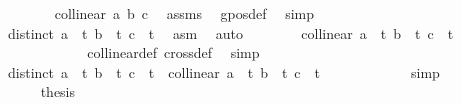 \begin{isabellebody}
\ \ \ \ \ \ \isamarkupfalse%
\ {}{\isacharcolon}{\kern0pt}{\isachardoublequoteopen}{\isasymnot}collinear{}\ a\ b\ c{\isachardoublequoteclose}\ \isamarkupfalse%
\ assms\ \isamarkupfalse%
\ gpos{\isacharunderscore}{\kern0pt}def\ \isamarkupfalse%
\ simp\isanewline
\ \ \ \ \ \ \isamarkupfalse%
\ {}{\isacharcolon}{\kern0pt}{\isachardoublequoteopen}distinct\ {\isacharbrackleft}{\kern0pt}a\ {\isacharplus}{\kern0pt}\ t{\isacharcomma}{\kern0pt}\ b\ {\isacharplus}{\kern0pt}\ t{\isacharcomma}{\kern0pt}\ c\ {\isacharplus}{\kern0pt}\ t{\isacharbrackright}{\kern0pt}{\isachardoublequoteclose}\ \isamarkupfalse%
\ asm{\isacharparenleft}{\kern0pt}{}{\isacharparenright}{\kern0pt}\ \isamarkupfalse%
\ auto\isanewline
\ \ \ \ \ \ \isamarkupfalse%
\ {\isachardoublequoteopen}{\isasymnot}collinear{}\ {\isacharparenleft}{\kern0pt}a\ {\isacharplus}{\kern0pt}\ t{\isacharparenright}{\kern0pt}\ {\isacharparenleft}{\kern0pt}b\ {\isacharplus}{\kern0pt}\ t{\isacharparenright}{\kern0pt}\ {\isacharparenleft}{\kern0pt}c\ {\isacharplus}{\kern0pt}\ t{\isacharparenright}{\kern0pt}{\isachardoublequoteclose}\ \isanewline
\ \ \ \ \ \ \ \ \isamarkupfalse%
\ {}\ \isamarkupfalse%
\ collinear{}{\isacharunderscore}{\kern0pt}def\ cross{}{\isacharunderscore}{\kern0pt}def\ \isamarkupfalse%
\ simp\isanewline
\ \ \ \ \ \ \isamarkupfalse%
\ \isamarkupfalse%
\ {\isachardoublequoteopen}distinct\ {\isacharbrackleft}{\kern0pt}a\ {\isacharplus}{\kern0pt}\ t{\isacharcomma}{\kern0pt}\ b\ {\isacharplus}{\kern0pt}\ t{\isacharcomma}{\kern0pt}\ c\ {\isacharplus}{\kern0pt}\ t{\isacharbrackright}{\kern0pt}\ {\isasymlongrightarrow}\ {\isasymnot}collinear{}\ {\isacharparenleft}{\kern0pt}a\ {\isacharplus}{\kern0pt}\ t{\isacharparenright}{\kern0pt}\ {\isacharparenleft}{\kern0pt}b\ {\isacharplus}{\kern0pt}\ t{\isacharparenright}{\kern0pt}\ {\isacharparenleft}{\kern0pt}c\ {\isacharplus}{\kern0pt}\ t{\isacharparenright}{\kern0pt}{\isachardoublequoteclose}\isanewline
\ \ \ \ \ \ \ \ \isamarkupfalse%
\ {}\ \isamarkupfalse%
\ simp\isanewline
\ \ \ \ \isakeywordONE{{\isacharbraceright}{\kern0pt}}\isamarkupfalse%
\isanewline
\ \ \ \ \isamarkupfalse%
\ {\isacharquery}{\kern0pt}thesis\ \isamarkupfalse%

\end{isabellebody}
